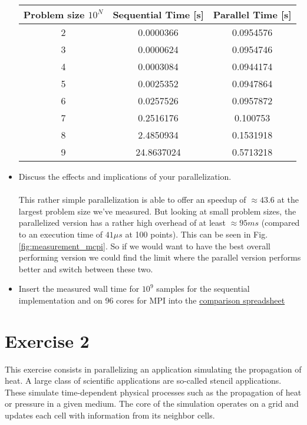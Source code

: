 \documentclass[UTF-8]{article}
\begin{document}
\begin{itemize}
\begin{table}[]
\begin{tabular}{|c|c|c|}
    	\hline
    	Problem size $10^N$ & Sequential Time [s] & Parallel Time [s] \\
    	\hline
    	2 & 0.0000366 & 0.0954576 \\
    	\hline
    	3 & 0.0000624 & 0.0954746 \\
    	\hline
    	4 & 0.0003084 & 0.0944174 \\
    	\hline
    	5 & 0.0025352 & 0.0947864 \\
    	\hline
    	6 & 0.0257526 & 0.0957872 \\
    	\hline
    	7 & 0.2516176 & 0.100753 \\
    	\hline
    	8 & 2.4850934 & 0.1531918 \\
    	\hline
    	9 & 24.8637024 & 0.5713218 \\
    	\hline
    \end{tabular}
\end{table}
\item Discuss the effects and implications of your parallelization. 
\\
\\
            This rather simple parallelization is able to offer an speedup of $\approx 43.6$ at the largest problem size we've measured. But looking at small problem sizes, the parallelized version has a rather high overhead of at least $\approx 95 ms$ (compared to an execution time of $41\mu s$ at 100 points). This can be seen in Fig. \ref{fig:measurement_mcpi}. So if we would want to have the best overall performing version we could find the limit where the parallel version performs better and switch between these two.
            
    	
    	\item Insert the measured wall time for $10^9$ samples for the sequential implementation and on 96 cores for MPI into the  \href{https://docs.google.com/spreadsheets/d/1p6d9F12EtykmI2-7MnHkg0U15UAtaCvWz8Ip92ZEsWo}{comparison spreadsheet}
    \end{itemize}
    
    
    \newpage
    \section*{Exercise 2}
	This exercise consists in parallelizing an application simulating the propagation of heat. A large class of scientific applications are so-called stencil applications. These simulate time-dependent physical processes such as the propagation of heat or pressure in a given medium. The core of the simulation operates on a grid and updates each cell with information from its neighbor cells.
	
\end{document}
